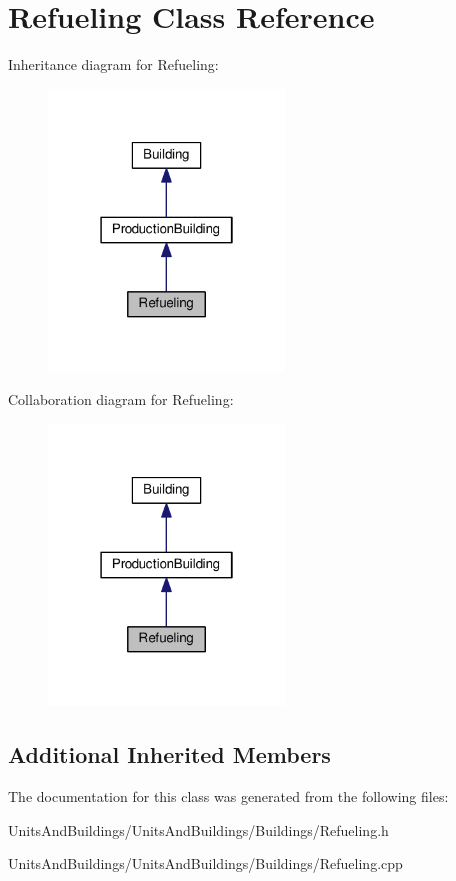\hypertarget{class_refueling}{}\section{Refueling Class Reference}
\label{class_refueling}


Inheritance diagram for Refueling\+:
\nopagebreak
\begin{figure}[H]
\begin{center}
\leavevmode
\includegraphics[width=178pt]{class_refueling__inherit__graph}
\end{center}
\end{figure}


Collaboration diagram for Refueling\+:
\nopagebreak
\begin{figure}[H]
\begin{center}
\leavevmode
\includegraphics[width=178pt]{class_refueling__coll__graph}
\end{center}
\end{figure}
\subsection*{Additional Inherited Members}


The documentation for this class was generated from the following files\+:\begin{DoxyCompactItemize}
\item 
Units\+And\+Buildings/\+Units\+And\+Buildings/\+Buildings/Refueling.\+h\item 
Units\+And\+Buildings/\+Units\+And\+Buildings/\+Buildings/Refueling.\+cpp\end{DoxyCompactItemize}
